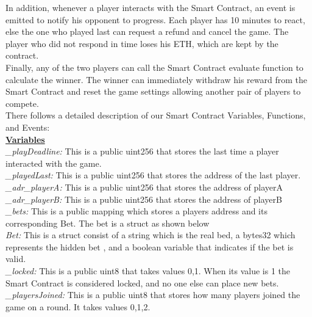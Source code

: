 \documentclass[12pt,a4paper]{article}
\begin{document}
In addition, whenever a player interacts with the Smart Contract, an event is emitted to notify his opponent to progress. Each player has 10 minutes to react, else the one who played last can request a refund and cancel the game. The player who did not respond in time loses his ETH, which are kept by the contract.\\

Finally, any of the two players can call the Smart Contract evaluate function to calculate the winner.
The winner can immediately withdraw his reward from the Smart Contract and reset the game settings
allowing another pair of players to compete. \\

There follows a detailed description of our Smart Contract Variables, Functions, and Events: \\

\textbf{\underline{Variables}} \\

\emph{\_playDeadline:} This is a public uint256 that stores the last time a player interacted with the game.\\

\emph{\_playedLast:} This is a public uint256 that stores the address of the last player.\\

\emph{\_adr\_playerA:} This is a public uint256 that stores the address of playerA\\

\emph{\_adr\_playerB:} This is a public uint256 that stores the address of playerB \\

\emph{\_bets:} This is a public mapping which stores a players address and its corresponding Bet. The bet is a struct as shown below\\

\emph{Bet:} This is a struct consist of a string which is the real bed, a bytes32 which represents the hidden bet
, and a boolean variable that indicates if the bet is valid.\\

\emph{\_locked:} This is a public uint8 that takes values 0,1. When its value
is 1 the Smart Contract is considered locked, and no one else can place new bets.\\

\emph{\_playersJoined:} This is a public uint8 that stores how many players joined the game on a round. It takes
values 0,1,2.\\
\end{document}
